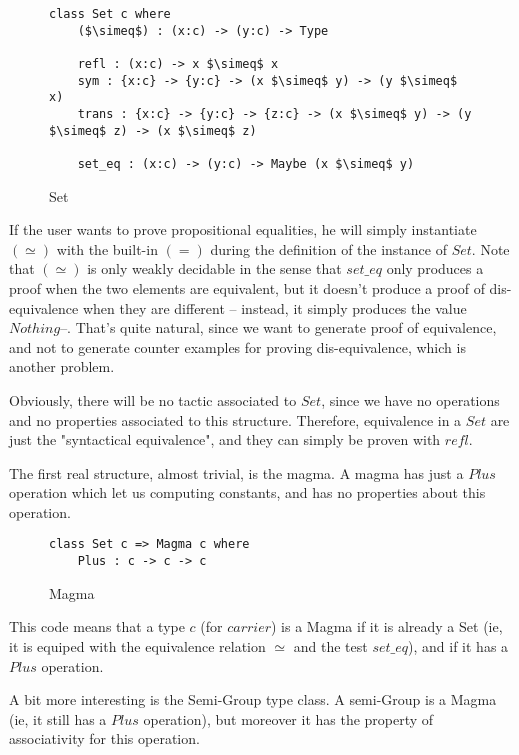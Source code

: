 \begin{figure}[H]
\figrule
\begin{center}
\begin{lstlisting}
class Set c where
    ($\simeq$) : (x:c) -> (y:c) -> Type

    refl : (x:c) -> x $\simeq$ x
    sym : {x:c} -> {y:c} -> (x $\simeq$ y) -> (y $\simeq$ x)
    trans : {x:c} -> {y:c} -> {z:c} -> (x $\simeq$ y) -> (y $\simeq$ z) -> (x $\simeq$ z)    
    
    set_eq : (x:c) -> (y:c) -> Maybe (x $\simeq$ y)
\end{lstlisting}
\end{center}
\caption{Set}
\figrule
\end{figure}
If the user wants to prove propositional equalities, he will simply instantiate $(\simeq)$ with the built-in $(=)$ during the definition of the instance of $Set$.
Note that $(\simeq)$ is only weakly decidable in the sense that $set\_eq$ only produces a proof when the two elements are equivalent, but it doesn't produce a proof of dis-equivalence when they are different -- instead, it simply produces the value $Nothing$--. That's quite natural, since we want to generate proof of equivalence, and not to generate counter examples for proving dis-equivalence, which is another problem.

Obviously, there will be no tactic associated to $Set$, since we have no operations and no properties associated to this structure. Therefore, equivalence in a $Set$ are just the "syntactical equivalence", and they can simply be proven with $refl$.

The first real structure, almost trivial, is the magma. A magma has just a $Plus$ operation which let us computing constants, and has no properties about this operation.

\begin{figure}[H]
\figrule
\begin{center}
\begin{lstlisting}
class Set c => Magma c where
    Plus : c -> c -> c
\end{lstlisting}
\end{center}
\caption{Magma}
\figrule
\end{figure}

This code means that a type $c$ (for $carrier$) is a Magma if it is already a Set (ie, it is equiped with the equivalence relation $\simeq$ and the test $set\_eq$), and if it has a $Plus$ operation.

A bit more interesting is the Semi-Group type class. A semi-Group is a Magma (ie, it still has a $Plus$ operation), but moreover it has the property of associativity for this operation.

